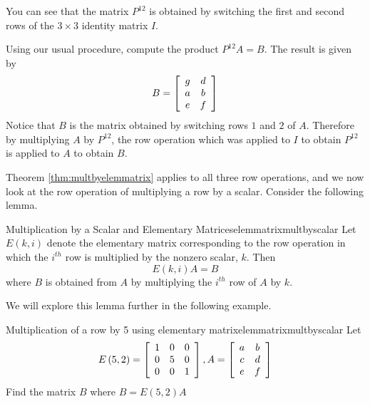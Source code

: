 \begin{solution}
You can see that the matrix $P^{12}$ is obtained by switching the first and second rows of the $3 \times 3$ identity matrix $I$.

Using our usual procedure, compute the product $P^{12}A = B$. The result is given by
\begin{equation*}
B =\left[
\begin{array}{cc}
g & d \\
a & b \\
e & f
\end{array}
\right]
\end{equation*}
Notice that $B$ is the matrix obtained by switching rows $1$ and $2$ of $A$. Therefore by  multiplying 
$A$ by $P^{12}$, the row operation which was applied to $I$ to obtain $P^{12}$ is applied to $A$ to obtain $B$. 
\end{solution}

Theorem \ref{thm:multbyelemmatrix} applies to all three row operations, and we now 
look at the row operation of multiplying a row by a scalar.  Consider the following lemma.

\begin{lemma}{Multiplication by a Scalar and Elementary Matrices}{elemmatrixmultbyscalar}
Let $E\left( k,i\right) $ denote the elementary matrix
corresponding to the row operation in which the $i^{th}$ row is multiplied
by the nonzero scalar, $k.$  Then
\begin{equation*}
E\left( k,i\right) A=B
\end{equation*}
where $B$ is obtained from $A$ by multiplying the $i^{th}$ row of $A$ by $k$.
\end{lemma}

We will explore this lemma further in the following example.

\begin{example}{Multiplication of a row by 5 using elementary matrix}{elemmatrixmultbyscalar}
Let
\begin{equation*}
E \left(5, 2\right) = \left[
\begin{array}{rrr}
1 & 0 & 0 \\
0 & 5 & 0 \\
0 & 0 & 1
\end{array}
\right], A =  \left[
\begin{array}{cc}
a & b \\
c & d \\
e & f
\end{array}
\right]
\end{equation*}
Find the matrix $B$ where $B = E \left(5, 2\right)A$
\end{example}

